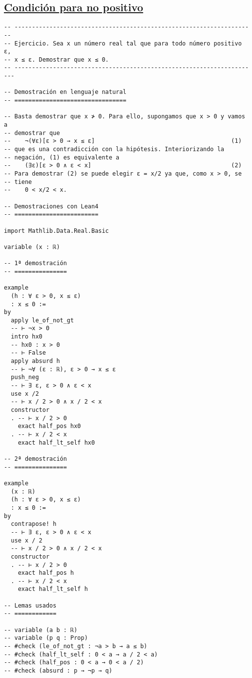 \subsection{\href{./src/Logica/Condicion\_para\_no\_positivo.lean}{Condición para no positivo}}
\label{sec:org5e0052e}
\begin{verbatim}
-- ---------------------------------------------------------------------
-- Ejercicio. Sea x un número real tal que para todo número positivo ε,
-- x ≤ ε. Demostrar que x ≤ 0.
-- ----------------------------------------------------------------------

-- Demostración en lenguaje natural
-- ================================

-- Basta demostrar que x ≯ 0. Para ello, supongamos que x > 0 y vamos a
-- demostrar que
--    ¬(∀ε)[ε > 0 → x ≤ ε]                                       (1)
-- que es una contradicción con la hipótesis. Interiorizando la
-- negación, (1) es equivalente a
--    (∃ε)[ε > 0 ∧ ε < x]                                        (2)
-- Para demostrar (2) se puede elegir ε = x/2 ya que, como x > 0, se
-- tiene
--    0 < x/2 < x.

-- Demostraciones con Lean4
-- ========================

import Mathlib.Data.Real.Basic

variable (x : ℝ)

-- 1ª demostración
-- ===============

example
  (h : ∀ ε > 0, x ≤ ε)
  : x ≤ 0 :=
by
  apply le_of_not_gt
  -- ⊢ ¬x > 0
  intro hx0
  -- hx0 : x > 0
  -- ⊢ False
  apply absurd h
  -- ⊢ ¬∀ (ε : ℝ), ε > 0 → x ≤ ε
  push_neg
  -- ⊢ ∃ ε, ε > 0 ∧ ε < x
  use x /2
  -- ⊢ x / 2 > 0 ∧ x / 2 < x
  constructor
  . -- ⊢ x / 2 > 0
    exact half_pos hx0
  . -- ⊢ x / 2 < x
    exact half_lt_self hx0

-- 2ª demostración
-- ===============

example
  (x : ℝ)
  (h : ∀ ε > 0, x ≤ ε)
  : x ≤ 0 :=
by
  contrapose! h
  -- ⊢ ∃ ε, ε > 0 ∧ ε < x
  use x / 2
  -- ⊢ x / 2 > 0 ∧ x / 2 < x
  constructor
  . -- ⊢ x / 2 > 0
    exact half_pos h
  . -- ⊢ x / 2 < x
    exact half_lt_self h

-- Lemas usados
-- ============

-- variable (a b : ℝ)
-- variable (p q : Prop)
-- #check (le_of_not_gt : ¬a > b → a ≤ b)
-- #check (half_lt_self : 0 < a → a / 2 < a)
-- #check (half_pos : 0 < a → 0 < a / 2)
-- #check (absurd : p → ¬p → q)
\end{verbatim}

